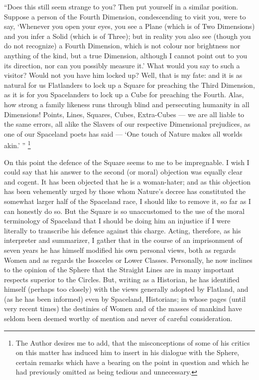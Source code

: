 \documentclass[12pt, a4paper, twoside]{memoir}
\begin{document}
``Does this still seem strange to you? Then put yourself in a similar position.
Suppose a person of the Fourth Dimension, condescending to visit you, were to
say, `Whenever you open your eyes, you see a Plane (which is of Two
Dimensions) and you infer a Solid (which is of Three); but in reality you also
see (though you do not recognize) a Fourth Dimension, which is not colour nor
brightness nor anything of the kind, but a true Dimension, although I cannot
point out to you its direction, nor can you possibly measure it.' What would
you say to such a visitor? Would not you have him locked up? Well, that is my
fate: and it is as natural for us Flatlanders to lock up a Square for
preaching the Third Dimension, as it is for you Spacelanders to lock up a Cube
for preaching the Fourth. Alas, how strong a family likeness runs through
blind and persecuting humanity in all Dimensions! Points, Lines, Squares,
Cubes, Extra-Cubes --- we are all liable to the same errors, all alike the
Slavers of our respective Dimensional prejudices, as one of our Spaceland
poets has said --- `One touch of Nature makes all worlds akin.' '' \footnote{The
Author desires me to add, that the misconceptions of some of his critics on
this matter has induced him to insert in his dialogue with
the Sphere, certain remarks which have a bearing on the point in question and
which he had previously omitted as being tedious and unnecessary.}

On this point the defence of the Square seems to me to be impregnable. I wish
I could say that his answer to the second (or moral) objection was equally
clear and cogent. It has been objected that he is a woman-hater; and as this
objection has been vehemently urged by those whom Nature's decree has
constituted the somewhat larger half of the Spaceland race, I should like to
remove it, so far as I can honestly do so. But the Square is so unaccustomed
to the use of the moral terminology of Spaceland that I should be doing him an
injustice if I were literally to transcribe his defence against this charge.
Acting, therefore, as his interpreter and summarizer, I gather that in the
course of an imprisonment of seven years he has himself modified his own
personal views, both as regards Women and as regards the Isosceles or Lower
Classes. Personally, he now inclines to the opinion of the Sphere  that the
Straight Lines are in many important respects superior to the
Circles. But, writing as a Historian, he has identified himself (perhaps too
closely) with the views generally adopted by Flatland, and (as he has been
informed) even by Spaceland, Historians; in whose pages (until very recent
times) the destinies of Women and of the masses of mankind have seldom been
deemed worthy of mention and never of careful consideration.
\end{document}
